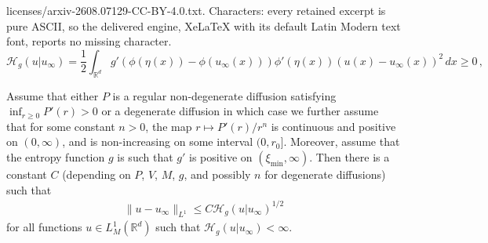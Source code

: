 \documentclass[10pt,a4paper]{amsart}
\newcommand{\R}{\mathbb{R}}
\newcommand{\uinf}{u_\infty}
\begin{document}
licenses/arxiv-2608.07129-CC-BY-4.0.txt. Characters: every retained excerpt is pure ASCII, so the delivered engine, XeLaTeX with its default Latin Modern text font, reports no missing character.
\begin{equation}\label{Taylorent}
 \mathcal{H}_g(u|u_\infty) = \frac12 \int_{\R^d} g'(\phi(\eta(x))-\phi(\uinf(x))) \phi'(\eta(x)) (u(x)-\uinf(x))^2 \,dx\geq 0\,,
\end{equation}

\begin{theorem}\label{gencz}
Assume that either $P$ is a regular non-degenerate diffusion satisfying $\inf_{r\ge0} P'(r)>0$ or a degenerate diffusion in which case we further assume that for some constant $n>0$, the map $r\mapsto P'(r)/r^n$ is continuous and positive on $(0,\infty)$, and is non-increasing on some interval $(0,r_0]$. Moreover, assume that the entropy function $g$ is such that $g'$ is positive on $(\xi_{\min},\infty)$.
Then there is a constant $C$ (depending on $P$, $V$, $M$, $g$, and possibly $n$ for degenerate diffusions) such that
    \begin{align}
        \label{eq:ourCK}
        \|u-\uinf\|_{L^1} \le C {\mathcal H}_g(u|\uinf)^{1/2}
    \end{align}
for all functions $u\in L^1_M(\R^d)$ such that ${\mathcal H}_g(u|\uinf)<\infty$.\\
\end{theorem}
\end{document}
